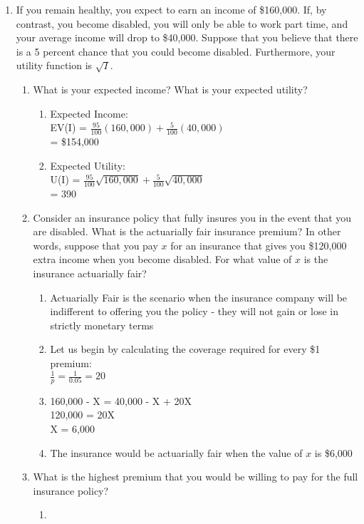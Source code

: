 \documentclass[11pt]{article}
\begin{document}
\begin{enumerate}
\item If you remain healthy, you expect to earn an income of \$160,000. If, by contrast, you become disabled, you will only be able to work part time, and your average income will drop to \$40,000. Suppose that you believe that there is a 5 percent chance that you could become disabled. Furthermore, your utility function is $\sqrt{I}$.
    \begin{enumerate}
    \item What is your expected income? What is your expected utility?
        \begin{enumerate}
            \item Expected Income:\\
            EV(I) = $\frac{95}{100}(160,000) + \frac{5}{100}(40,000) $\\
            = \$154,000
            \item Expected Utility:\\
            U(I) = $\frac{95}{100}\sqrt{160,000} + \frac{5}{100}\sqrt{40,000}$\\
            = 390
        \end{enumerate}

    \item Consider an insurance policy that fully insures you in the event that you are disabled. What is the actuarially fair insurance premium? In other words, suppose that you pay $x$ for an insurance that gives you \$120,000 extra income when you become disabled. For what value of $x$ is the insurance actuarially fair?
        \begin{enumerate}
            \item Actuarially Fair is the scenario when the insurance company will be indifferent to offering you the policy - they will not gain or lose in strictly monetary terms
            \item Let us begin by calculating the coverage required for every \$1 premium:\\
            $\frac{1}{p}=\frac{1}{0.05}=20$
            \item 160,000 - X = 40,000 - X + 20X\\
            120,000 = 20X\\
            X = 6,000
            \item The insurance would be actuarially fair when the value of $x$ is \$6,000
        \end{enumerate}

    \item What is the highest premium that you would be willing to pay for the full insurance policy?
        \begin{enumerate}
            \item 
        \end{enumerate}
    \end{enumerate}
        
\end{enumerate}
\end{document}
